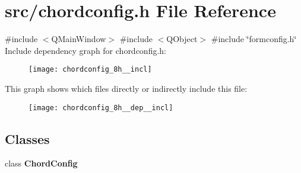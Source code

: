 \section{src/chordconfig.h File Reference}
\label{chordconfig_8h}
{\ttfamily \#include $<$Q\+Main\+Window$>$}\newline
{\ttfamily \#include $<$Q\+Object$>$}\newline
{\ttfamily \#include \char`\"{}formconfig.\+h\char`\"{}}\newline
Include dependency graph for chordconfig.\+h\+:\nopagebreak
\begin{figure}[H]
\begin{center}
\leavevmode
\texttt{[image: chordconfig\_8h\_\_incl]}
\end{center}
\end{figure}
This graph shows which files directly or indirectly include this file\+:\nopagebreak
\begin{figure}[H]
\begin{center}
\leavevmode
\texttt{[image: chordconfig\_8h\_\_dep\_\_incl]}
\end{center}
\end{figure}
\subsection*{Classes}
\begin{DoxyCompactItemize}
\item 
class \textbf{ Chord\+Config}
\end{DoxyCompactItemize}
